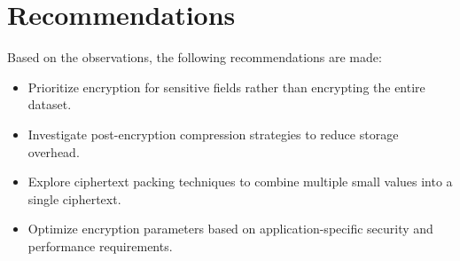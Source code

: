 \section{Recommendations}

Based on the observations, the following recommendations are made:

\begin{itemize}
    \item Prioritize encryption for sensitive fields rather than encrypting the entire dataset.
    \item Investigate post-encryption compression strategies to reduce storage overhead.
    \item Explore ciphertext packing techniques to combine multiple small values into a single ciphertext.
    \item Optimize encryption parameters based on application-specific security and performance requirements.
\end{itemize}

\clearpage
